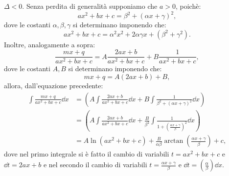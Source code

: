 \begin{aenumerate}
\item $\Delta<0$. Senza perdita di generalità supponiamo che $a>0$, poichè:
\[ax^2+bx+c=\beta^2+(\alpha x+\gamma)^2,\]
dove le costanti $\alpha,\beta,\gamma$ si determinano imponendo che:
\[ax^2+bx+c=\alpha^2 x^2+2\alpha\gamma x + (\beta^2+\gamma^2).\]
Inoltre, analogamente a sopra:
\[\frac{mx+q}{ax^2+bx+c}=A\frac{2ax+b}{ax^2+bx+c}+B\frac{1}{ax^2+bx+c},\]
dove le costanti $A,B$ si determinano imponendo che:
\[mx+q=A(2ax+b)+B,\]
allora, dall'equazione precedente:
\begin{equation}
\begin{split}
\int\frac{mx+q}{ax^2+bx+c}\dd x & = \left(A\int\frac{2ax+b}{ax^2+bx+c}\dd x + B\int\frac{1}{\beta^2+(\alpha x+\gamma)^2}\dd x\right) \\
& = \left(A\int\frac{2ax+b}{ax^2+bx+c}\dd x+\frac{B}{\beta^2}\int\frac{1}{1+(\frac{\alpha x+\gamma}{\beta})^2}\dd x\right) \\
& = A\ln(ax^2+bx+c)+\frac{B}{\alpha\beta}\arctan(\frac{\alpha x+\gamma}{\beta})+c,
\end{split}
\end{equation}
dove nel primo integrale si è fatto il cambio di variabili $t=ax^2+bx+c$ e $\dd t=2ax+b$ e nel secondo il cambio di variabili $t=\frac{\alpha x+\gamma}{\beta}$ e $\dd t=(\frac{\alpha}{\beta})\dd x$.
\end{aenumerate}